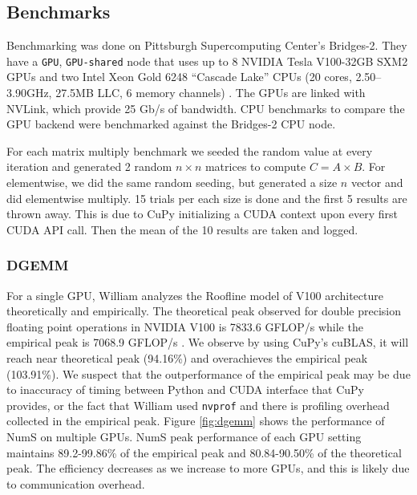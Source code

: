 \documentclass{article}
\begin{document}
\subsection{Benchmarks}
Benchmarking was done on Pittsburgh Supercomputing Center's Bridges-2. They have a \verb|GPU|, \verb|GPU-shared| node that uses up to 8 NVIDIA Tesla V100-32GB SXM2 GPUs and two Intel Xeon Gold 6248 “Cascade Lake” CPUs (20 cores, 2.50–3.90GHz, 27.5MB LLC, 6 memory channels) \cite{psc}. The GPUs are linked with NVLink, which provide 25 Gb/s of bandwidth. CPU benchmarks to compare the GPU backend were benchmarked against the Bridges-2 CPU node.

For each matrix multiply benchmark we seeded the random value at every iteration and generated 2 random $n \times n$ matrices to compute $C =  A \times B$. For elementwise, we did the same random seeding, but generated a size $n$ vector and did elementwise multiply. 15 trials per each size is done and the first 5 results are thrown away. This is due to CuPy initializing a CUDA context upon every first CUDA API call. Then the mean of the 10 results are taken and logged.

\subsubsection{DGEMM}
For a single GPU, William analyzes the Roofline model of V100 architecture theoretically and empirically. The theoretical peak observed for double precision floating point operations in NVIDIA V100 is 7833.6 GFLOP/s while the empirical peak is 7068.9 GFLOP/s \cite{roofline}. We observe by using CuPy's cuBLAS, it will reach near theoretical peak (94.16\%) and overachieves the empirical peak (103.91\%). We suspect that the outperformance of the empirical peak may be due to inaccuracy of timing between Python and CUDA interface that CuPy provides, or the fact that William used \verb|nvprof| and there is profiling overhead collected in the empirical peak. Figure \ref{fig:dgemm} shows the performance of NumS on multiple GPUs. NumS peak performance of each GPU setting maintains 89.2-99.86\% of the empirical peak and 80.84-90.50\% of the theoretical peak. The efficiency decreases as we increase to more GPUs, and this is likely due to communication overhead.
\end{document}
